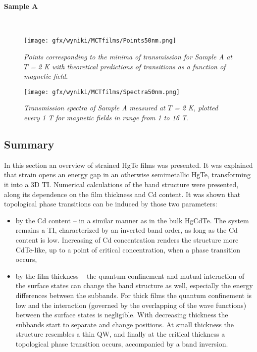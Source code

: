 \documentclass[titlepage,a4paper]{book}
\newcommand{\wciecie}{\quad\phantom{v}}
\newcommand{\myparagraph}[1]{\paragraph{#1}\mbox{}\\}
\begin{document}
\myparagraph{Sample A}
\begin{figure}[H]
	\centering
	\texttt{[image: gfx/wyniki/MCTfilms/Points50nm.png]}
	\vspace{-10pt}
	\caption{\textit{Points corresponding to the minima of transmission for Sample A at $T$ = 2 K with theoretical predictions of transitions as a function of magnetic field. 
}}
	\label{fig:Points50nm}
\end{figure}
\begin{figure}[H]
	\centering
	\texttt{[image: gfx/wyniki/MCTfilms/Spectra50nm.png]}
	\vspace{-10pt}
	\caption{\textit{Transmission spectra of Sample A measured at $T$ = 2 K, plotted every 1 T for magnetic fields in range from 1 to 16 T.}}
	\label{fig:Spectra50nm}
\end{figure}


\subsection{Summary}
\wciecie
In this section an overview of strained HgTe films was presented. It was explained that strain opens an energy gap in an otherwise semimetallic HgTe, transforming it into a 3D TI. Numerical calculations of the band structure were presented, along its dependence on the film thickness and Cd content. It was shown that topological phase transitions can be induced by those two parameters:
\begin{itemize}
\item by the Cd content -- in a similar manner as in the bulk HgCdTe. The system remains a TI, characterized by an inverted band order, as long as the Cd content is low. Increasing of Cd concentration renders the structure more CdTe-like, up to a point of critical concentration, when a phase transition occurs,
\item by the film thickness -- the quantum confinement and mutual interaction of the surface states can change the band structure as well, especially the energy differences between the subbands. For thick films the quantum confinement is low and the interaction (governed by the overlapping of the wave functions) between the surface states is negligible. With decreasing thickness the subbands start to separate and change positions. At small thickness the structure resembles a thin QW, and finally at the critical thickness a topological phase transition occurs, accompanied by a band inversion.
\end{itemize}
\end{document}
